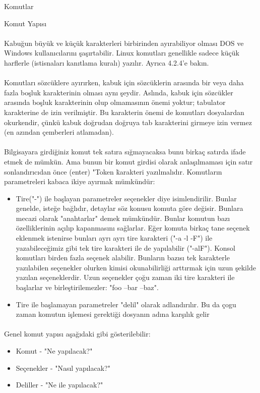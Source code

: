 \documentclass[10pt,a5paper]{book}
\begin{document}
\begin{section}{Komutlar}
\begin{subsection}{Komut Yapısı}
\paragraph{}{Kabuğun büyük ve küçük karakterleri birbirinden ayırabiliyor olması DOS ve Windows kullanıcılarını şaşırtabilir. Linux komutları genellikle sadece küçük harflerle (istisnaları kanıtlama kuralı) yazılır. Ayrıca 4.2.4'e bakın.}
\paragraph{}{Komutları sözcüklere ayırırken, kabuk için sözcüklerin arasında bir veya daha fazla boşluk karakterinin olması aynı şeydir. Aslında, kabuk için sözcükler arasında boşluk karakterinin olup olmamasının önemi yoktur; tabulator karakterine de izin verilmiştir. Bu karakterin önemi de komutları dosyalardan okurkendir, çünkü kabuk doğrudan doğruya tab karakterini girmeye izin vermez (en azından çemberleri atlamadan).}
\paragraph{}{Bilgisayara girdiğiniz komut tek satıra sığmayacaksa bunu birkaç satırda ifade etmek de mümkün. Ama bunun bir komut girdisi olarak  anlaşılmaması için satır sonlandırıcıdan önce (enter) "Token \" karakteri yazılmalıdır. Komutların parametreleri kabaca ikiye ayırmak mümkündür:
\begin{itemize}
 \item Tire("-") ile başlayan parametreler seçenekler diye isimlendirilir. Bunlar genelde, isteğe bağlıdır, detaylar söz konusu komuta göre değisir. Bunlara mecazi olarak "anahtarlar" demek mümkündür. Bunlar komutun bazı özelliklerinin açılıp kapanmasını sağlarlar. Eğer komuta birkaç tane seçenek eklenmek istenirse bunları ayrı ayrı tire karakteri ("-a -l -F") ile yazabileceğimiz gibi tek tire karakteri ile de yapılabilir ("-alF"). Konsol komutları birden fazla seçenek alabilir. Bunların bazısı tek karakterle yazılabilen seçenekler olurken kimisi okunabilirliği arttırmak için uzun şekilde yazılan seçeneklerdir. Uzun seçenekler çoğu zaman iki tire karakteri ile başlarlar ve birleştirilemezler: "foo --bar --baz".
 \item Tire ile başlamayan parametreler "delil" olarak adlandırılır. Bu da çogu zaman komutun işlemesi gerektiği dosyanın adına karşılık gelir
\end{itemize}
}
\paragraph{}{Genel komut yapısı aşağıdaki gibi gösterilebilir:
\begin{itemize}
\item Komut - "Ne yapılacak?"
\item Seçenekler - "Nasıl yapılacak?"
\item Deliller - "Ne ile yapılacak?"
\end{itemize}
}
\end{subsection}

\end{section}
\end{document}
